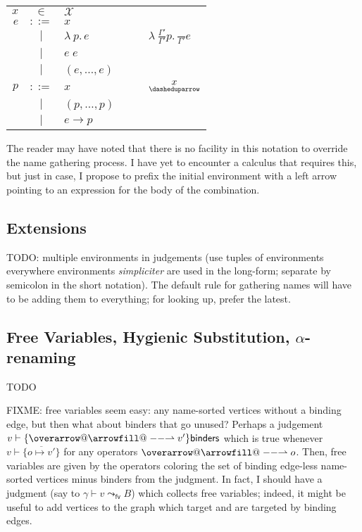 \documentclass[11pt]{article} %
\makeatletter
\theoremstyle{definition}
\newcommand{\fn}{\lambda\:\!}
\def\rightharpoonupfill@{\arrowfill@\relbar\relbar\rightharpoonup}
\newcommand{\harpvec}{%
   \mathpalette{\overarrow@\rightharpoonupfill@}}
\makeatother
\begin{document}
\begin{tabular}{rclcl}
$x$ & $\in$ & $\mathcal{X}$ &$\quad$& \\
$e$ & $::=$ & $x$ &&  \\
& $\mid$ & $\fn p.\,e$ && $\fn \frac{\Gamma'}{\Gamma'}p.\, \frac{}{\Gamma'}e$ \\
& $\mid$ & $e\;e$ &&  \\
& $\mid$ & $(e, \ldots, e)$ &&  \\
$p$ & $::=$ & $x$ && $\underset{\dasheduparrow}x$ \\
& $\mid$ & $(p, \ldots, p)$ &&  \\
& $\mid$ & $e \to p$ &&  \\
\end{tabular}

The reader may have noted that there is no facility in this notation to override the name gathering process.
I have yet to encounter a calculus that requires this, but just in case, I propose to prefix the initial environment with a left arrow pointing to an expression for the body of the combination.

\subsection{Extensions}

TODO: multiple environments in judgements (use tuples of environments everywhere environments \textit{simpliciter} are used in the long-form; separate by semicolon in the short notation).
The default rule for gathering names will have to be adding them to everything; for looking up, prefer the latest.

\subsection{Free Variables, Hygienic Substitution, $\alpha$-renaming}

TODO

FIXME: free variables seem easy: any name-sorted vertices without a binding edge, but then what about binders that go unused?
Perhaps a judgement $v \vdash \{\harpvec{v'}\} \mathsf{ binders}$ which is true whenever $v \vdash \{\overline{o \mapsto v'}\}$ for any operators $\harpvec o$.
Then, free variables are given by the operators coloring the set of binding edge-less name-sorted vertices minus binders from the judgment.
In fact, I should have a judgment (say to $\gamma \vdash v \leadsto_\mathsf{fv} B$) which collects free variables;
indeed, it might be useful to add vertices to the graph which target and are targeted by binding edges.
\end{document}
